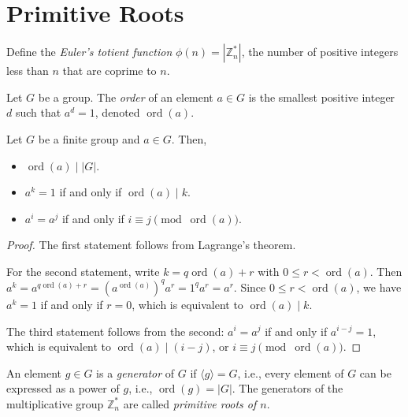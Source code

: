 
\section*{Primitive Roots}

\begin{definition}
    Define the \emph{Euler's totient function} \(\phi(n) = |\mathbb{Z}_n^*|\), the number of positive integers less than \(n\) that are coprime to \(n\).
\end{definition}

\begin{definition}[Order]
    Let \(G\) be a group.
    The \emph{order} of an element \(a \in G\) is the smallest positive integer \(d\) such that \(a^d = 1\), denoted \(\operatorname{ord}(a)\).
\end{definition}

\begin{proposition}
    Let \(G\) be a finite group and \(a \in G\).  Then,
    \begin{itemize}
        \item \(\operatorname{ord}(a) \mid |G|\).
        \item \(a^k = 1\) if and only if \(\operatorname{ord}(a) \mid k\).
        \item \(a^i = a^j\) if and only if \(i \equiv j \pmod{\operatorname{ord}(a)}\).
    \end{itemize}
\end{proposition}

\begin{proof}
    The first statement follows from Lagrange's theorem.

    For the second statement, write \(k = q \operatorname{ord}(a) + r\) with \(0 \leq r < \operatorname{ord}(a)\).
    Then \(a^k = a^{q \operatorname{ord}(a) + r} = (a^{\operatorname{ord}(a)})^q a^r = 1^q a^r = a^r\).
    Since \(0 \leq r < \operatorname{ord}(a)\), we have \(a^k = 1\) if and only if \(r = 0\), which is equivalent to \(\operatorname{ord}(a) \mid k\).

    The third statement follows from the second: \(a^i = a^j\) if and only if \(a^{i-j} = 1\), which is equivalent to \(\operatorname{ord}(a) \mid (i-j)\), or \(i \equiv j \pmod{\operatorname{ord}(a)}\).
\end{proof}

\begin{definition}
    An element \(g \in G\) is a \emph{generator} of \(G\) if \(\langle g \rangle = G\), i.e., every element of \(G\) can be expressed as a power of \(g\), i.e., \(\operatorname{ord}(g) = |G|\).
    The generators of the multiplicative group \(\mathbb{Z}_n^*\) are called \emph{primitive roots of \(n\)}.
\end{definition}


